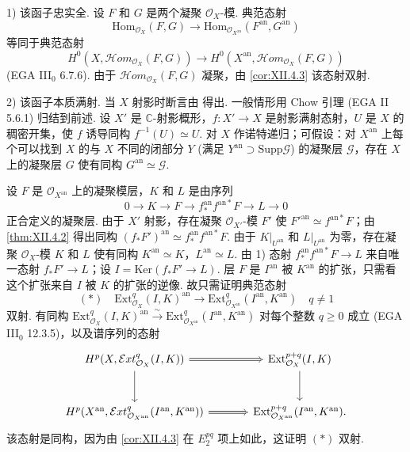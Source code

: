 1) 该函子忠实全. 设 $F$ 和 $G$ 是两个凝聚 $\mathcal{O}_X$-模. 典范态射
\[
\mathrm{Hom}_{\mathcal{O}_X}(F, G) \longrightarrow \mathrm{Hom}_{\mathcal{O}_{X^{\mathrm{an}}}}(F^{\mathrm{an}}, G^{\mathrm{an}})
\]
等同于典范态射
\[
H^0(X, \mathcal{H}om_{\mathcal{O}_X}(F, G)) \longrightarrow H^0(X^{\mathrm{an}}, \mathcal{H}om_{\mathcal{O}_X}(F, G))
\]
(EGA III$_0$ 6.7.6). 由于 $\mathcal{H}om_{\mathcal{O}_X}(F, G)$ 凝聚，由 \ref{cor:XII.4.3} 该态射双射.

2) 该函子本质满射. 当 $X$ 射影时断言由 \cite[第 12 号 定理 3]{exp12-10} 得出. 一般情形用 Chow 引理 (EGA II 5.6.1) 归结到前述. 设 $X'$ 是 $\mathbb{C}$-射影概形，$f \colon X' \to X$ 是射影满射态射，$U$ 是 $X$ 的稠密开集，使 $f$ 诱导同构 $f^{-1}(U) \simeq U$. 对 $X$ 作诺特递归；可假设：对 $X^{\mathrm{an}}$ 上每个可以找到 $X$ 的与 $X$ 不同的闭部分 $Y$ (满足 $Y^{\mathrm{an}} \supset \mathrm{Supp} \mathcal{G}$) 的凝聚层 $\mathcal{G}$，存在 $X$ 上的凝聚层 $G$ 使有同构 $G^{\mathrm{an}} \simeq \mathcal{G}$.

设 $F$ 是 $\mathcal{O}_{X^{\mathrm{an}}}$ 上的凝聚模层，$K$ 和 $L$ 是由序列
\[
0 \longrightarrow K \longrightarrow F \longrightarrow f_*^{\mathrm{an}} f^{\mathrm{an}*} F \longrightarrow L \longrightarrow 0
\]
正合定义的凝聚层. 由于 $X'$ 射影，存在凝聚 $\mathcal{O}_{X'}$-模 $F'$ 使 $F'^{\mathrm{an}} \simeq f^{\mathrm{an}*} F$；由 \ref{thm:XII.4.2} 得出同构 $(f_* F')^{\mathrm{an}} \simeq f_*^{\mathrm{an}} f^{\mathrm{an}*} F$. 由于 $K|_{U^{\mathrm{an}}}$ 和 $L|_{U^{\mathrm{an}}}$ 为零，存在凝聚 $\mathcal{O}_X$-模 $K$ 和 $L$ 使有同构 $K^{\mathrm{an}} \simeq K$，$L^{\mathrm{an}} \simeq L$. 由 1) 态射 $f_*^{\mathrm{an}} f^{\mathrm{an}*} F \to L$ 来自唯一态射 $f_* F' \to L$；设 $I = \mathrm{Ker}(f_* F' \to L)$. 层 $F$ 是 $I^{\mathrm{an}}$ 被 $K^{\mathrm{an}}$ 的扩张，只需看这个扩张来自 $I$ 被 $K$ 的扩张的逆像. 故只需证明典范态射
\[
(\ast) \quad \mathrm{Ext}^q_{\mathcal{O}_X}(I, K)^{\mathrm{an}} \longrightarrow \mathrm{Ext}^q_{\mathcal{O}_{X^{\mathrm{an}}}}(I^{\mathrm{an}}, K^{\mathrm{an}}) \quad q \neq 1
\]
双射. 有同构 $\mathrm{Ext}^q_{\mathcal{O}_X}(I, K)^{\mathrm{an}} \xrightarrow{\sim} \mathrm{Ext}^q_{\mathcal{O}_{X^{\mathrm{an}}}}(I^{\mathrm{an}}, K^{\mathrm{an}})$ 对每个整数 $q \geqslant 0$ 成立 (EGA III$_0$ 12.3.5)，以及谱序列的态射
\[
\begin{tikzcd}[row sep=large, column sep=large]
H^p(X, \mathcal{E}xt^q_{\mathcal{O}_X}(I, K)) \arrow[r, Rightarrow] \arrow[d] & \mathrm{Ext}^{p+q}_{\mathcal{O}_X}(I, K) \arrow[d] \\
H^p(X^{\mathrm{an}}, \mathcal{E}xt^q_{\mathcal{O}_{X^{\mathrm{an}}}}(I^{\mathrm{an}}, K^{\mathrm{an}})) \arrow[r, Rightarrow] & \mathrm{Ext}^{p+q}_{\mathcal{O}_{X^{\mathrm{an}}}}(I^{\mathrm{an}}, K^{\mathrm{an}}).
\end{tikzcd}
\]
该态射是同构，因为由 \ref{cor:XII.4.3} 在 $E^{pq}_2$ 项上如此，这证明 $(\ast)$ 双射.

